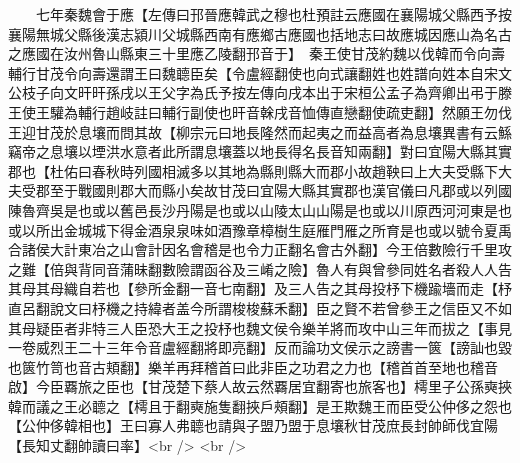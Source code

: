 　　七年秦魏會于應【左傳曰邘晉應韓武之穆也杜預註云應國在襄陽城父縣西予按襄陽無城父縣後漢志潁川父城縣西南有應鄉古應國也括地志曰故應城因應山為名古之應國在汝州魯山縣東三十里應乙陵翻邘音于】　秦王使甘茂約魏以伐韓而令向壽輔行甘茂令向壽還謂王曰魏聼臣矣【令盧經翻使也向式讓翻姓也姓譜向姓本自宋文公枝子向文旰旰孫戌以王父字為氏予按左傳向戌本出于宋桓公孟子為齊卿出弔于滕王使王驩為輔行趙岐註曰輔行副使也旰音榦戌音恤傳直戀翻使疏吏翻】然願王勿伐王迎甘茂於息壤而問其故【柳宗元曰地長隆然而起夷之而益高者為息壤異書有云鯀竊帝之息壤以堙洪水意者此所謂息壤蓋以地長得名長音知兩翻】對曰宜陽大縣其實郡也【杜佑曰春秋時列國相滅多以其地為縣則縣大而郡小故趙鞅曰上大夫受縣下大夫受郡至于戰國則郡大而縣小矣故甘茂曰宜陽大縣其實郡也漢官儀曰凡郡或以列國陳魯齊吳是也或以舊邑長沙丹陽是也或以山陵太山山陽是也或以川原西河河東是也或以所出金城城下得金酒泉泉味如酒豫章樟樹生庭雁門雁之所育是也或以號令夏禹合諸侯大計東冶之山會計因名會稽是也令力正翻名會古外翻】今王倍數險行千里攻之難【倍與背同音蒲昧翻數險謂函谷及三崤之險】魯人有與曾參同姓名者殺人人告其母其母織自若也【參所金翻一音七南翻】及三人告之其母投杼下機踰墻而走【杼直呂翻說文曰杼機之持緯者盖今所謂梭梭蘇禾翻】臣之賢不若曾參王之信臣又不如其母疑臣者非特三人臣恐大王之投杼也魏文侯令樂羊將而攻中山三年而拔之【事見一卷威烈王二十三年令音盧經翻將即亮翻】反而論功文侯示之謗書一篋【謗訕也毀也篋竹笥也音古頬翻】樂羊再拜稽首曰此非臣之功君之力也【稽首首至地也稽音啟】今臣覉旅之臣也【甘茂楚下蔡人故云然覉居宜翻寄也旅客也】樗里子公孫奭挾韓而議之王必聼之【樗且于翻奭施隻翻挾戶頰翻】是王欺魏王而臣受公仲侈之怨也【公仲侈韓相也】王曰寡人弗聼也請與子盟乃盟于息壤秋甘茂庶長封帥師伐宜陽【長知丈翻帥讀曰率】<br />
<br />
